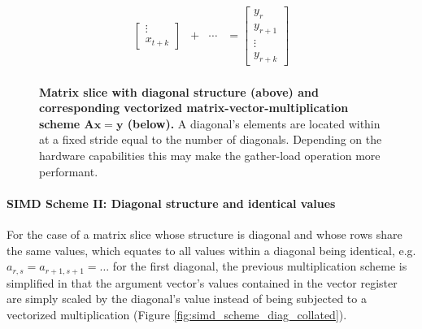 \documentclass{article}
\begin{document}
\begin{figure}[ht]
$$\begin{matrix}
\begin{bmatrix}
                                                                                \vdots \\
                                                                                x_{t+k}
                                                                              \end{bmatrix} & + & \cdots & = \begin{bmatrix}
                                                                                                                 y_{r} \\
                                                                                                                 y_{r+1} \\
                                                                                                                 \vdots \\
                                                                                                                 y_{r+k}
                                                                                                                \end{bmatrix}\\

        \end{matrix}
        $$
        \caption[Matrix slice with diagonal structure and corresponding vectorized matrix-vector multiplication scheme.]{\textbf{Matrix slice with diagonal structure (above) and corresponding vectorized matrix-vector-multiplication scheme $\bm{Ax = y}$ (below).} A diagonal's elements are located within \V at a fixed stride equal to the number of diagonals. Depending on the hardware capabilities this may make the gather-load operation more performant.}
        \label{fig:simd_scheme_diag}
      \end{figure}

      \paragraph{SIMD Scheme II: Diagonal structure and identical values}

      For the case of a matrix slice whose structure is diagonal and whose rows share the same values, which equates to all values within a diagonal being identical, e.g. $a_{r,s} = a_{r+1, s+1} = \ldots$ for the first diagonal, the previous multiplication scheme is simplified in that the argument vector's values contained in the vector register are simply scaled by the diagonal's value instead of being subjected to a vectorized multiplication (Figure \ref{fig:simd_scheme_diag_collated}).
\end{document}
